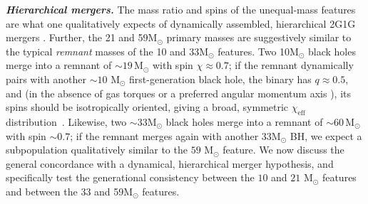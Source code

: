 \documentclass[%
    aps,
    prl,
    reprint,
    superscriptaddress,
    nolongbibliography,
    nobibnotes,
    nofootinbib,
    linenumbers,
    amsmath,amssymb,
]{revtex4-2}
\newcommand{\Msun}{\ensuremath{\mathrm{M}_{\odot}}}
\newcommand{\chieff}{\ensuremath{\chi_{\mathrm{eff}}}}
\newcommand{\twoGoneG}{\ac{2G1G}\xspace}
\newcommand{\jh}[1]{{\color{orange}JH: #1}}
\newcommand{\featTen}{10\xspace}
\newcommand{\featTwenty}{21\xspace}
\newcommand{\featThirtyFive}{33\xspace}
\newcommand{\featSixty}{59\xspace}
\newcommand{\heading}[1]{\textbf{\textit{#1}}}
\begin{document}
\heading{Hierarchical mergers.}
The mass ratio and spins of the unequal-mass features are what one qualitatively expects of dynamically assembled, hierarchical \twoGoneG mergers \cite{Gerosa:2021mno}. Further, the \featTwenty and \featSixty $\Msun$ primary masses are suggestively similar to the typical \textit{remnant} masses of the \featTen and \featThirtyFive $\Msun$ features. Two \featTen $\Msun$ black holes merge into a remnant of $\sim 19\,\Msun$ with spin $\chi \approx 0.7$; if the remnant dynamically pairs with another $\sim \featTen$ $\Msun$ first-generation black hole, the binary has $q \approx 0.5$, and (in the absence of gas torques or a preferred angular momentum axis \cite[e.g.,][]{Stone:2016wzz, McKernan:2019beu, Santini:2023ukl}), its spins should be isotropically oriented, giving a broad, symmetric $\chieff$ distribution~\cite{Fishbach:2017dwv, Gerosa:2017kvu, Rodriguez:2019huv, Gerosa:2021mno, Ginat:2026awh}. Likewise, two $\sim$\featThirtyFive $\Msun$ black holes merge into a remnant of $\sim 60\,\Msun$ with spin $\sim 0.7$; if the remnant merges again with another \featThirtyFive $\Msun$ \ac{BH}, we expect a subpopulation qualitatively similar to the $\featSixty$ $\Msun$ feature. We now discuss the general concordance with a dynamical, hierarchical merger hypothesis, and specifically test the generational consistency between the $\featTen$ and $\featTwenty$ $\Msun$ features and between the \featThirtyFive and \featSixty $\Msun$ features. %


\end{document}
